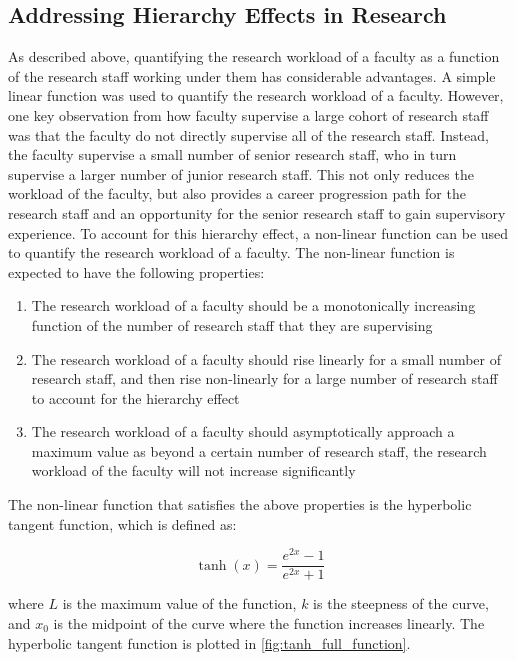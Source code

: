 \subsection{Addressing Hierarchy Effects in Research}

As described above, quantifying the research workload of a faculty as a function of the research staff working under them has considerable advantages. A simple linear function was used to quantify the research workload of a faculty. However, one key observation from how faculty supervise a large cohort of research staff was that the faculty do not directly supervise all of the research staff. Instead, the faculty supervise a small number of senior research staff, who in turn supervise a larger number of junior research staff. This not only reduces the workload of the faculty, but also provides a career progression path for the research staff and an opportunity for the senior research staff to gain supervisory experience. To account for this hierarchy effect, a non-linear function can be used to quantify the research workload of a faculty. The non-linear function is expected to have the following properties:

\begin{enumerate}

  \item The research workload of a faculty should be a monotonically increasing function of the number of research staff that they are supervising
  \item The research workload of a faculty should rise linearly for a small number of research staff, and then rise non-linearly for a large number of research staff to account for the hierarchy effect
  \item The research workload of a faculty should asymptotically approach a maximum value as beyond a certain number of research staff, the research workload of the faculty will not increase significantly

\end{enumerate}

The non-linear function that satisfies the above properties is the hyperbolic tangent function, which is defined as:

\begin{equation*}
  \tanh(x) = \frac{e^{2x} - 1}{e^{2x} + 1}
\end{equation*}

where $L$ is the maximum value of the function, $k$ is the steepness of the curve, and $x_0$ is the midpoint of the curve where the function increases linearly. The hyperbolic tangent function is plotted in \autoref{fig:tanh_full_function}.

